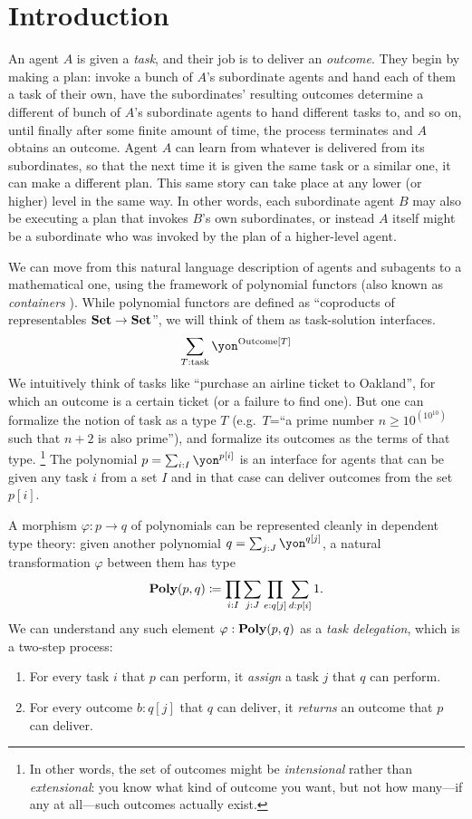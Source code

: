 \chapter{Introduction}\label{sec:intro}

An agent $A$ is given a \emph{task}, and their job is to deliver an \emph{outcome}. They begin by making a plan: invoke a bunch of $A$'s subordinate agents and hand each of them a task of their own, have the subordinates' resulting outcomes determine a different of bunch of $A$'s subordinate agents to hand different tasks to, and so on, until finally after some finite amount of time, the process terminates and $A$ obtains an outcome. Agent $A$ can learn from whatever is delivered from its subordinates, so that the next time it is given the same task or a similar one, it can make a different plan. This same story can take place at any lower (or higher) level in the same way. In other words, each subordinate agent $B$ may also be executing a plan that invokes $B$'s own subordinates, or instead $A$ itself might be a subordinate who was invoked by the plan of a higher-level agent.

We can move from this natural language description of agents and subagents to a mathematical one, using the framework of polynomial functors (also known as \emph{containers} \cite{abbott2005containers,abbot2003categoriesthesis,ahman2014when}). While polynomial functors are defined as ``coproducts of representables $\mathbf{Set}\to\mathbf{Set}$'', we will think of them as task-solution interfaces.
\[
\sum_{T:\text{task}}\yon^{\text{Outcome}[T]}
\]
We intuitively think of tasks like ``purchase an airline ticket to Oakland'', for which an outcome is a certain ticket (or a failure to find one). But one can formalize the notion of task as a type $T$ (e.g.\ $T$=``a prime number $n\geq10^{(10^{10})}$ such that $n+2$ is also prime''), and formalize its outcomes as the terms of that type.%
\footnote{In other words, the set of outcomes might be \emph{intensional} rather than \emph{extensional}: you know what kind of outcome you want, but not how many---if any at all---such outcomes actually exist.} The polynomial $p=\sum_{i:I}\yon^{p[i]}$ is an interface for agents that can be given any task $i$ from a set $I$ and in that case can deliver outcomes from the set $p[i]$.

A morphism $\varphi\colon p\to q$ of polynomials can be represented cleanly in dependent type theory: given another polynomial $q=\sum_{j:J}\yon^{q[j]}$, a natural transformation $\varphi$ between them has type
\[
\mathbf{Poly}(p,q)\coloneqq\prod_{i:I}\sum_{j:J}\prod_{e:q[j]}\sum_{d:p[i]}1.
\]
We can understand any such element $\varphi:\mathbf{Poly}(p,q)$ as a \emph{task delegation}, which is a two-step process: 
\begin{enumerate}
\item For every task $i$ that $p$ can perform, it \emph{assign} a task $j$ that $q$ can perform.
\item For every outcome $b:q[j]$ that $q$ can deliver, it \emph{returns} an outcome that $p$ can deliver.
\end{enumerate}

